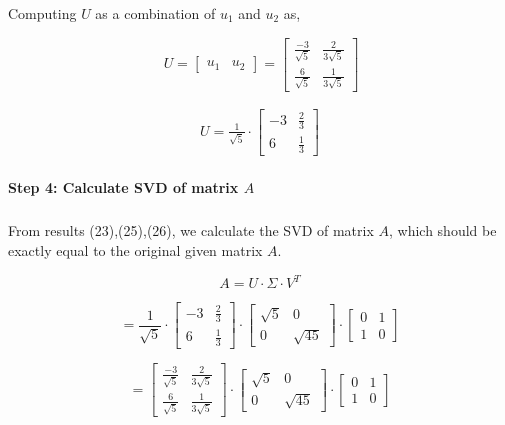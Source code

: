 \documentclass[a4paper]{report}
\begin{document}
Computing $U$ as a combination of $u_1$ and $u_2$ as,

\[\ U=\begin{bmatrix}
    u_1&u_2
\end{bmatrix} = \begin{bmatrix}
    \frac{-3}{\sqrt{5}}&\frac{2}{3\sqrt{5}}\\\frac{6}{\sqrt{5}}&\frac{1}{3\sqrt{5}}
\end{bmatrix} \]

\begin{align}
    \boxed{U= \frac{1}{\sqrt{5}}\cdot\begin{bmatrix}
    -3&\frac{2}{3}\\6&\frac{1}{3}
\end{bmatrix}}
\end{align} 

\paragraph{Step 4: Calculate SVD of matrix $A$}

\subparagraph{}


From results (23),(25),(26), we calculate the SVD of matrix $A$, which should be exactly equal to the original given matrix $A$.

$$A=U\cdot \Sigma \cdot V^T$$

\[=\frac{1}{\sqrt{5}}\cdot\begin{bmatrix}
    -3&\frac{2}{3}\\6&\frac{1}{3}
\end{bmatrix}\cdot \begin{bmatrix}
    \sqrt{5}&0\\0&\sqrt{45}
\end{bmatrix}\cdot \begin{bmatrix}
    0&1\\1&0
\end{bmatrix}\]

\[=\begin{bmatrix}
    \frac{-3}{\sqrt{5}}&\frac{2}{3\sqrt{5}}\\\frac{6}{\sqrt{5}}&\frac{1}{3\sqrt{5}}
\end{bmatrix} \cdot \begin{bmatrix}
    \sqrt{5}&0\\0&\sqrt{45}
\end{bmatrix}\cdot \begin{bmatrix}
    0&1\\1&0
\end{bmatrix} \]
\end{document}
